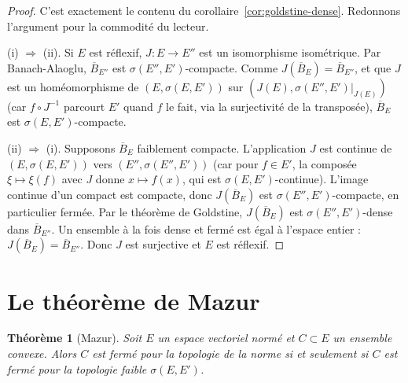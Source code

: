 \documentclass[a4paper,12pt]{book}
\theoremstyle{definition}
\theoremstyle{plain}
\newtheorem{theoreme}[definition]{Théorème}
\theoremstyle{remark}
\begin{document}
\begin{proof}
C'est exactement le contenu du corollaire~\ref{cor:goldstine-dense}. Redonnons
l'argument pour la commodité du lecteur.

\medskip
\noindent (i) $\Rightarrow$ (ii). Si $E$ est réflexif, $J : E \to E''$ est un
isomorphisme isométrique. Par Banach-Alaoglu, $\overline{B}_{E''}$ est
$\sigma(E'',E')$-compacte. Comme $J(\overline{B}_E) = \overline{B}_{E''}$,
et que $J$ est un homéomorphisme de $(E, \sigma(E,E'))$ sur $(J(E), \sigma(E'',E')|_{J(E)})$
(car $f \circ J^{-1}$ parcourt $E'$ quand $f$ le fait, via la surjectivité de la
transposée), $\overline{B}_E$ est $\sigma(E,E')$-compacte.

\medskip
\noindent (ii) $\Rightarrow$ (i). Supposons $\overline{B}_E$ faiblement compacte.
L'application $J$ est continue de $(E, \sigma(E,E'))$ vers $(E'', \sigma(E'',E'))$
(car pour $f \in E'$, la composée $\xi \mapsto \xi(f)$ avec $J$ donne $x \mapsto f(x)$,
qui est $\sigma(E,E')$-continue). L'image continue d'un compact est compacte, donc
$J(\overline{B}_E)$ est $\sigma(E'',E')$-compacte, en particulier fermée. Par le
théorème de Goldstine, $J(\overline{B}_E)$ est $\sigma(E'',E')$-dense dans
$\overline{B}_{E''}$. Un ensemble à la fois dense et fermé est égal à l'espace entier :
$J(\overline{B}_E) = \overline{B}_{E''}$. Donc $J$ est surjective et $E$ est réflexif.
\end{proof}


\section{Le théorème de Mazur}
\label{sec:mazur}


\begin{theoreme}[Mazur]
\label{thm:mazur}
Soit $E$ un espace vectoriel normé et $C \subset E$ un ensemble convexe.
Alors $C$ est fermé pour la topologie de la norme si et seulement si $C$ est fermé
pour la topologie faible $\sigma(E, E')$.
\end{theoreme}
\end{document}
